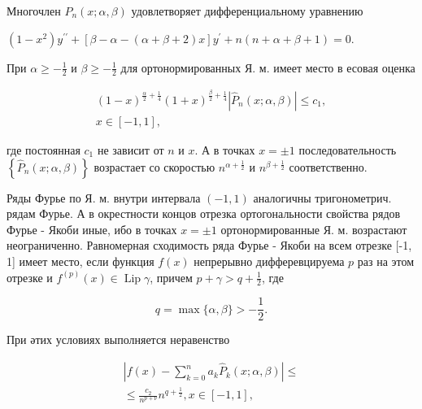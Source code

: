 \documentclass[10pt]{article}
\begin{document}
Многочлен $P_{n}(x ; \alpha, \beta)$ удовлетворяет дифференциальному уравнению



$\left(1-x^{2}\right) y^{\prime \prime}+[\beta-\alpha-(\alpha+\beta+2) x] y^{\prime}+n(n+\alpha+\beta+1)=0$.



При $\alpha \geqslant-\frac{1}{2}$ и $\beta \geqslant-\frac{1}{2}$ для ортонормированных Я. м. имеет место в есовая оценка



\[

\begin{gathered}

(1-x)^{\frac{\alpha}{2}+\frac{1}{4}}(1+x)^{\frac{\beta}{2}+\frac{1}{4}}\left|\hat{P}_{n}(x ; \alpha, \beta)\right| \leqslant c_{1}, \\

x \in[-1,1],

\end{gathered}

\]



где постоянная $c_{1}$ не зависит от $n$ и $x$. А в точках $x= \pm 1$ последовательность $\left\{\hat{P}_{n}(x ; \alpha, \beta)\right\}$ возрастает со скоростью $n^{\alpha+\frac{1}{2}}$ и $n^{\beta+\frac{1}{2}}$ соответственно.



Ряды Фурье по Я. м. внутри интервала $(-1,1)$ аналогичны тригонометрич. рядам Фурье. А в окрестности концов отрезка ортогональности свойства рядов Фурье - Якоби иные, ибо в точках $x= \pm 1$ ортонормированные Я. м. возрастают неограниченно. Равномерная сходимость ряда Фурье - Якоби на всем отрезке [-1, 1] имеет место, если функция $f(x)$ непрерывно дифферевцируема $p$ раз на этом отрезке и $f^{(p)}(x) \in \operatorname{Lip} \gamma$, причем $p+\gamma>q+\frac{1}{2}$, где



\[

q=\max \{\alpha, \beta\}>-\frac{1}{2} .

\]



При әтих условиях выполняется неравенство



\[

\begin{gathered}

\left|f(x)-\sum_{k=0}^{n} a_{k} \hat{P}_{k}(x ; \alpha, \beta)\right| \leqslant \\

\leqslant \frac{c_{2}}{n^{p+\nu}} n^{q+\frac{1}{2}}, x \in[-1,1],

\end{gathered}

\]
\end{document}
